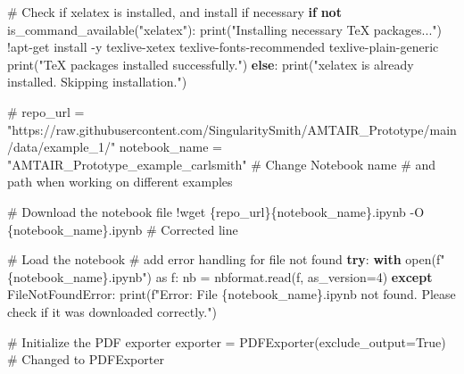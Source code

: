 \documentclass[
  11pt,
  letterpaper,
]{book}
\newenvironment{Shaded}{\begin{snugshade}}{\end{snugshade}}
\newcommand{\BuiltInTok}[1]{\textcolor[rgb]{0.00,0.23,0.31}{#1}}
\newcommand{\CommentTok}[1]{\textcolor[rgb]{0.37,0.37,0.37}{#1}}
\newcommand{\ControlFlowTok}[1]{\textcolor[rgb]{0.00,0.23,0.31}{\textbf{#1}}}
\newcommand{\DecValTok}[1]{\textcolor[rgb]{0.68,0.00,0.00}{#1}}
\newcommand{\ImportTok}[1]{\textcolor[rgb]{0.00,0.46,0.62}{#1}}
\newcommand{\KeywordTok}[1]{\textcolor[rgb]{0.00,0.23,0.31}{\textbf{#1}}}
\newcommand{\NormalTok}[1]{\textcolor[rgb]{0.00,0.23,0.31}{#1}}
\newcommand{\OperatorTok}[1]{\textcolor[rgb]{0.37,0.37,0.37}{#1}}
\newcommand{\PreprocessorTok}[1]{\textcolor[rgb]{0.68,0.00,0.00}{#1}}
\newcommand{\SpecialCharTok}[1]{\textcolor[rgb]{0.37,0.37,0.37}{#1}}
\newcommand{\SpecialStringTok}[1]{\textcolor[rgb]{0.13,0.47,0.30}{#1}}
\newcommand{\StringTok}[1]{\textcolor[rgb]{0.13,0.47,0.30}{#1}}
\newcommand{\VariableTok}[1]{\textcolor[rgb]{0.07,0.07,0.07}{#1}}
\begin{document}
\begin{Shaded}
\begin{Highlighting}[]
\CommentTok{\# Check if xelatex is installed, and install if necessary}
\ControlFlowTok{if} \KeywordTok{not}\NormalTok{ is\_command\_available(}\StringTok{"xelatex"}\NormalTok{):}
    \BuiltInTok{print}\NormalTok{(}\StringTok{"Installing necessary TeX packages..."}\NormalTok{)}
    \OperatorTok{!}\NormalTok{apt}\OperatorTok{{-}}\NormalTok{get install }\OperatorTok{{-}}\NormalTok{y texlive}\OperatorTok{{-}}\NormalTok{xetex texlive}\OperatorTok{{-}}\NormalTok{fonts}\OperatorTok{{-}}\NormalTok{recommended texlive}\OperatorTok{{-}}\NormalTok{plain}\OperatorTok{{-}}\NormalTok{generic}
    \BuiltInTok{print}\NormalTok{(}\StringTok{"TeX packages installed successfully."}\NormalTok{)}
\ControlFlowTok{else}\NormalTok{:}
    \BuiltInTok{print}\NormalTok{(}\StringTok{"xelatex is already installed. Skipping installation."}\NormalTok{)}

\CommentTok{\# repo\_url = "https://raw.githubusercontent.com/SingularitySmith/AMTAIR\_Prototype/main/data/example\_1/"}
\NormalTok{notebook\_name }\OperatorTok{=} \StringTok{"AMTAIR\_Prototype\_example\_carlsmith"}  \CommentTok{\# Change Notebook name}
                                  \CommentTok{\# and path when working on different examples}

\CommentTok{\# Download the notebook file}
\OperatorTok{!}\NormalTok{wget \{repo\_url\}\{notebook\_name\}.ipynb }\OperatorTok{{-}}\NormalTok{O \{notebook\_name\}.ipynb  }\CommentTok{\# Corrected line}

\CommentTok{\# Load the notebook}
\CommentTok{\# add error handling for file not found}
\ControlFlowTok{try}\NormalTok{:}
  \ControlFlowTok{with} \BuiltInTok{open}\NormalTok{(}\SpecialStringTok{f"}\SpecialCharTok{\{}\NormalTok{notebook\_name}\SpecialCharTok{\}}\SpecialStringTok{.ipynb"}\NormalTok{) }\ImportTok{as}\NormalTok{ f:}
\NormalTok{    nb }\OperatorTok{=}\NormalTok{ nbformat.read(f, as\_version}\OperatorTok{=}\DecValTok{4}\NormalTok{)}
\ControlFlowTok{except} \PreprocessorTok{FileNotFoundError}\NormalTok{:}
  \BuiltInTok{print}\NormalTok{(}\SpecialStringTok{f"Error: File \textquotesingle{}}\SpecialCharTok{\{}\NormalTok{notebook\_name}\SpecialCharTok{\}}\SpecialStringTok{.ipynb\textquotesingle{} not found. Please check if it was downloaded correctly."}\NormalTok{)}


\CommentTok{\# Initialize the PDF exporter}
\NormalTok{exporter }\OperatorTok{=}\NormalTok{ PDFExporter(exclude\_output}\OperatorTok{=}\VariableTok{True}\NormalTok{)  }\CommentTok{\# Changed to PDFExporter}


\end{Highlighting}
\end{Shaded}
\end{document}
